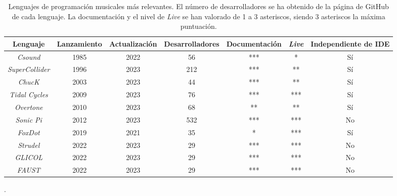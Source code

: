 \begin{table}[h] %
  \begin{center}
  \caption[Lenguajes de programación musicales más relevantes]{Lenguajes de programación musicales más relevantes. El número de desarrolladores se ha obtenido de la página de GitHub de cada lenguaje. La documentación y el nivel de \textit{Live} se han valorado de 1 a 3 asteriscos, siendo 3 asteriscos la máxima puntuación.}
  \begin{tabular}{| c | c | c | c | c | c | c |}
  \hline
  Lenguaje & Lanzamiento & Actualización & Desarrolladores & Documentación & \textit{Live} & Independiente de IDE\\
  \hline
  \textit{Csound} & 1985 & 2022 & 56 & *** & * & Sí\\
  \textit{SuperCollider} & 1996 & 2023 & 212 & *** & ** & Sí\\
  \textit{ChucK} & 2003 & 2023 & 44 & *** & ** & Sí\\
  \textit{Tidal Cycles} & 2009 & 2023 & 76 & *** & *** & Sí\\
  \textit{Overtone} & 2010 & 2023 & 68 & ** & ** & Sí\\
  \textit{Sonic Pi} & 2012 & 2023 & 532 & *** & *** & No\\
  \textit{FoxDot} & 2019 & 2021 & 35 & * & *** & Sí\\
  \textit{Strudel} & 2022 & 2023 & 29 & *** & *** & No\\

  \textit{GLICOL} & 2022 & 2023 & 29 & *** & *** & No\\ %
  \textit{FAUST} & 2022 & 2023 & 29 & *** & *** & No\\ %
  \hline
  \end{tabular}
  .
  \label{tab:lenguajes_comparativa}
  \end{center}
\end{table} 